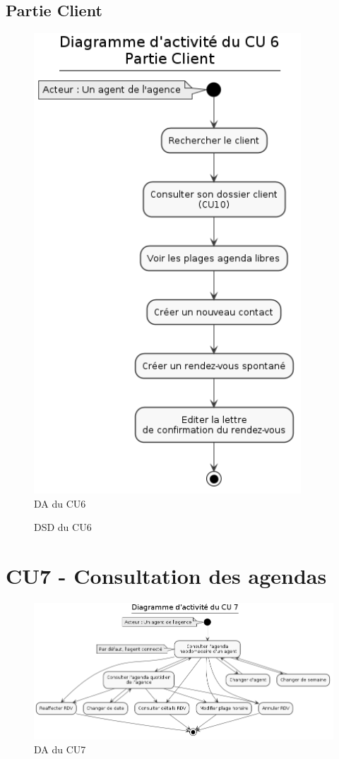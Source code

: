 \subsection{Partie Client}
\begin{figure}[h]
\centering
\includegraphics[width=10cm]{figures/DA_CU6_partieClient.png}
\caption{DA du CU6}
\end{figure}

\begin{figure}[h]
\centering
\caption{DSD du CU6}
\end{figure}

\clearpage
\section{CU7 - Consultation des agendas}
\begin{figure}[h]
\centering
\includegraphics[width=\textwidth]{figures/DA_CU7.png}
\caption{DA du CU7}
\end{figure}

